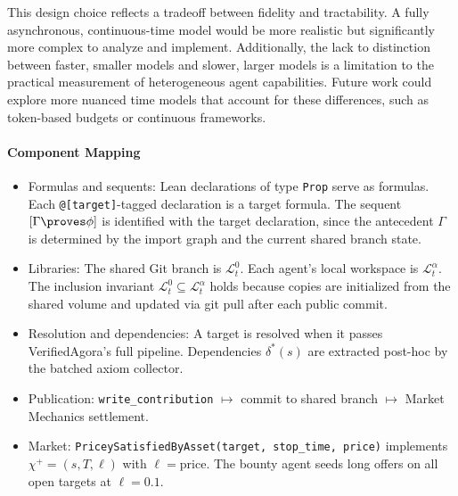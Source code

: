 \begin{remark}
This design choice reflects a tradeoff between fidelity and tractability. A fully asynchronous, continuous-time model would be more realistic but significantly more complex to analyze and implement. Additionally, the lack to distinction between faster, smaller models and slower, larger models is a limitation to the practical measurement of heterogeneous agent capabilities. Future work could explore more nuanced time models that account for these differences, such as token-based budgets or continuous frameworks.
\end{remark}

\paragraph{Component Mapping}
\begin{itemize}
    \item Formulas and sequents: Lean declarations of type \texttt{Prop} serve as formulas. Each \texttt{@[target]}-tagged declaration is a target formula. The sequent $[\Gamma \proves \phi]$ is identified with the target declaration, since the antecedent $\Gamma$ is determined by the import graph and the current shared branch state.
    \item Libraries: The shared Git branch is $\mathcal{L}^0_t$. Each agent's local workspace is $\mathcal{L}^\alpha_t$. The inclusion invariant $\mathcal{L}^0_t \subseteq \mathcal{L}^\alpha_t$ holds because copies are initialized from the shared volume and updated via git pull after each public commit.
    \item Resolution and dependencies: A target is resolved when it passes VerifiedAgora's full pipeline. Dependencies $\delta^*(s)$ are extracted post-hoc by the batched axiom collector.
    \item Publication: \texttt{write\_contribution} $\mapsto$ commit to shared branch $\mapsto$ Market Mechanics settlement.
    
    \item Market: \texttt{PriceySatisfiedByAsset(target, stop\_time, price)} implements $\chi^+ = (s, T, \ell)$ with $\ell = \mathrm{price}$. The bounty agent seeds long offers on all open targets at $\ell = 0.1$.
    

\end{itemize}
